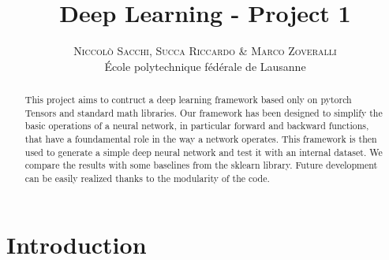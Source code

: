 \documentclass[10pt,conference,compsocconf]{IEEEtran}
\begin{document}
        
\pretitle{\begin{center}\Huge\bfseries} %
\posttitle{\end{center}} %
\title{Deep Learning - Project 1}
\author{
        \textsc{Niccol\`{o} Sacchi, Succa Riccardo \& Marco Zoveralli}
        \normalsize{} \\
        \normalsize \'{E}cole polytechnique f\'{e}d\'{e}rale de Lausanne
}
\maketitle
\begin{abstract}
  This project aims to contruct a deep learning framework based only on pytorch Tensors and standard math libraries. Our framework has been designed to simplify the basic operations of a neural network, in particular forward and backward functions, that have a foundamental role in the way a network operates.
  This framework is then used to generate a simple deep neural network and test it with an internal dataset. We compare the results with some baselines from the sklearn library.
  Future development can be easily realized thanks to the modularity of the code.
\end{abstract}
\section{Introduction}
    
\end{document}
